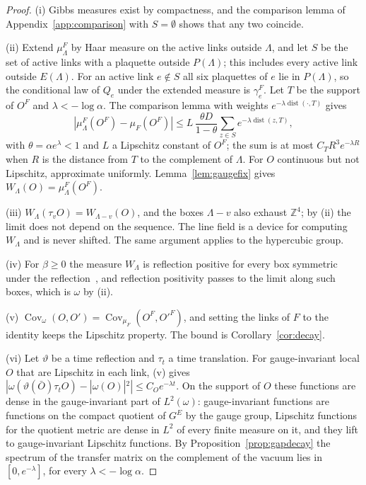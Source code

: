 \documentclass[11pt]{amsart}
\theoremstyle{definition}
\theoremstyle{remark}
\numberwithin{equation}{section}
\newcommand{\Z}{\mathbb{Z}}
\newcommand{\Cov}{\operatorname{Cov}}
\newcommand{\dist}{\operatorname{dist}}
\begin{document}
\begin{proof}
(i) Gibbs measures exist by compactness, and the comparison lemma of
Appendix~\ref{app:comparison} with $S=\emptyset$ shows that any two coincide.

(ii) Extend $\mu^F_\Lambda$ by Haar measure on the active links outside
$\Lambda$, and let $S$ be the set of active links with a plaquette outside
$P(\Lambda)$; this includes every active link outside $E(\Lambda)$. For an
active link $e\notin S$ all six plaquettes of $e$ lie in $P(\Lambda)$, so the
conditional law of $Q_e$ under the extended measure is $\gamma^F_e$. Let $T$
be the support of $O^F$ and $\lambda<-\log\alpha$. The comparison lemma with
weights $e^{-\lambda\dist(\cdot,T)}$ gives
\[
|\mu^F_\Lambda(O^F)-\mu_F(O^F)|\le L\,\frac{\theta D}{1-\theta}
\sum_{z\in S}e^{-\lambda\dist(z,T)},
\]
with $\theta=\alpha e^\lambda<1$ and $L$ a Lipschitz constant of $O^F$; the
sum is at most $C_TR^3e^{-\lambda R}$ when $R$ is the distance from $T$ to the
complement of $\Lambda$. For $O$ continuous but not Lipschitz, approximate
uniformly. Lemma~\ref{lem:gaugefix} gives $W_\Lambda(O)=\mu^F_\Lambda(O^F)$.

(iii) $W_\Lambda(\tau_vO)=W_{\Lambda-v}(O)$, and the boxes $\Lambda-v$ also
exhaust $\Z^4$; by (ii) the limit does not depend on the sequence. The line
field is a device for computing $W_\Lambda$ and is never shifted. The same
argument applies to the hypercubic group.

(iv) For $\beta\ge0$ the measure $W_\Lambda$ is reflection positive for every
box symmetric under the reflection~\cite{OSei78}, and reflection positivity
passes to the limit along such boxes, which is $\omega$ by (ii).

(v) $\Cov_\omega(O,O')=\Cov_{\mu_F}(O^F,O'^F)$, and setting the links of $F$
to the identity keeps the Lipschitz property. The bound is
Corollary~\ref{cor:decay}.

(vi) Let $\vartheta$ be a time reflection and $\tau_t$ a time translation.
For gauge-invariant local $O$ that are Lipschitz in each link, (v) gives
$|\omega(\vartheta(\bar O)\tau_tO)-|\omega(O)|^2|\le C_Oe^{-\lambda t}$. On
the support of $O$ these functions are dense in the gauge-invariant part of
$L^2(\omega)$: gauge-invariant functions are functions on the compact
quotient of $G^{E}$ by the gauge group, Lipschitz functions for the quotient
metric are dense in $L^2$ of every finite measure on it, and they lift to
gauge-invariant Lipschitz functions. By Proposition~\ref{prop:gapdecay} the spectrum
of the transfer matrix on the complement of the vacuum lies in
$[0,e^{-\lambda}]$, for every $\lambda<-\log\alpha$.
\end{proof}
\end{document}
